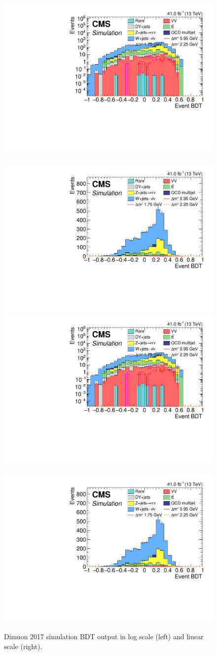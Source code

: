 \begin{figure}[!htb]
\includegraphics[width=0.48\linewidth]{plots/track_muon_bg_signal/none_exTrack_dilepBDTCorrJetNoMultIso10Dr0.6_log.pdf} \,
\includegraphics[width=0.48\linewidth]{plots/track_muon_bg_signal/none_exTrack_dilepBDTCorrJetNoMultIso10Dr0.6.pdf} \\

\includegraphics[width=0.48\linewidth]{plots/track_muon_bg_signal/none_exTrack_dilepBDTCorrJetNoMultIso10Dr0.6_log.pdf} \,
\includegraphics[width=0.48\linewidth]{plots/track_muon_bg_signal/none_exTrack_dilepBDTCorrJetNoMultIso10Dr0.6.pdf} \\

\caption[Exclusive track simulation BDT output]{Dimuon 2017 simulation BDT output in log scale (left) and linear scale (right).}
\label{fig:exclusive-track-bdt-sim-output}
\end{figure}

